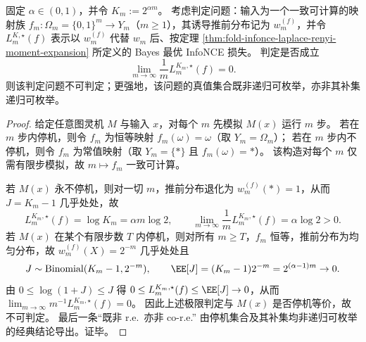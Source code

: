 \begin{theorem}\label{thm:fold-infonce-rate-undecidable}
固定 \(\alpha\in(0,1)\)，并令 \(K_m:=2^{\alpha m}\)。
考虑判定问题：输入为一个一致可计算的映射族 \(f_m:\Omega_m=\{0,1\}^m\to Y_m\)（\(m\ge 1\)），其诱导推前分布记为 \(w_m^{(f)}\)，并令 \(L_{m}^{K,\star}(f)\) 表示以 \(w_m^{(f)}\) 代替 \(w_m\) 后、按定理 \ref{thm:fold-infonce-laplace-renyi-moment-expansion} 所定义的 Bayes 最优 InfoNCE 损失。
判定是否成立
\[
\lim_{m\to\infty}\frac{1}{m}L_{m}^{K_m,\star}(f)=0.
\]
则该判定问题不可判定；更强地，该问题的真值集合既非递归可枚举，亦非其补集递归可枚举。
\end{theorem}
\begin{proof}
给定任意图灵机 \(M\) 与输入 \(x\)，对每个 \(m\) 先模拟 \(M(x)\) 运行 \(m\) 步。
若在 \(m\) 步内停机，则令 \(f_m\) 为恒等映射 \(f_m(\omega)=\omega\)（取 \(Y_m=\Omega_m\)）；
若在 \(m\) 步内不停机，则令 \(f_m\) 为常值映射（取 \(Y_m=\{\ast\}\) 且 \(f_m(\omega)=\ast\)）。
该构造对每个 \(m\) 仅需有限步模拟，故 \(m\mapsto f_m\) 一致可计算。
\par
若 \(M(x)\) 永不停机，则对一切 \(m\)，推前分布退化为 \(w_m^{(f)}(\ast)=1\)，从而 \(J=K_m-1\) 几乎处处，故
\[
L_{m}^{K_m,\star}(f)=\log K_m=\alpha m\log 2,
\qquad
\lim_{m\to\infty}\frac{1}{m}L_{m}^{K_m,\star}(f)=\alpha\log 2>0.
\]
若 \(M(x)\) 在某个有限步数 \(T\) 内停机，则对所有 \(m\ge T\)，\(f_m\) 恒等，推前分布为均匀分布，故 \(w_m^{(f)}(X)=2^{-m}\) 几乎处处且
\[
J\sim\mathrm{Binomial}(K_m-1,2^{-m}),
\qquad
\EE[J]=(K_m-1)2^{-m}=2^{(\alpha-1)m}\to 0.
\]
由 \(0\le \log(1+J)\le J\) 得
\(
0\le L_{m}^{K_m,\star}(f)\le \EE[J]\to 0
\)，从而
\(
\lim_{m\to\infty}m^{-1}L_{m}^{K_m,\star}(f)=0
\)。
因此上述极限判定与 \(M(x)\) 是否停机等价，故不可判定。
最后一条“既非 r.e.\ 亦非 co-r.e.” 由停机集合及其补集均非递归可枚举的经典结论导出。证毕。
\end{proof}

